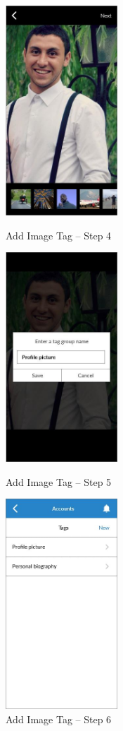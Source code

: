 \begin{figure}
  \subfigures
  \centering
  \begin{minipage}{4.6cm}
    \centering
    \includegraphics[width=4.2cm]{inc/ui_itag_step4.jpg}
    \caption{Add Image Tag -- Step 4}
    \label{fig:ui_itag_step4}
  \end{minipage}
  \begin{minipage}{4.6cm}
    \centering
    \includegraphics[width=4.2cm]{inc/ui_itag_step5.jpg}
    \caption{Add Image Tag -- Step 5}
    \label{fig:ui_itag_step5}
  \end{minipage}
  \begin{minipage}{4.6cm}
    \centering
    \includegraphics[width=4.2cm]{inc/ui_itag_step6.jpg}
    \caption{Add Image Tag -- Step 6}
    \label{fig:ui_itag_step6}
  \end{minipage}
\end{figure}

